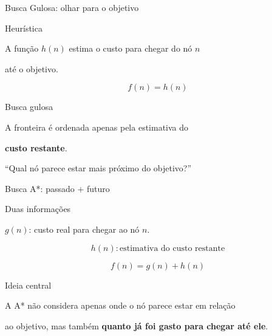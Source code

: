 \documentclass[xcolor=dvipsnames,table]{beamer}
\begin{document}
\begin{frame}{Busca Gulosa: olhar para o objetivo}

    \begin{block}{Heurística}

        A função $h(n)$ estima o custo para chegar do nó $n$

        até o objetivo.

    \end{block}

    \begin{center}

        \Large

        \[
        \boxed{f(n)=h(n)}
        \]

    \end{center}

    \begin{block}{Busca gulosa}

        A fronteira é ordenada apenas pela estimativa do

        \textbf{custo restante}.

        \medskip

        \centering

        ``Qual nó parece estar mais próximo do objetivo?''

    \end{block}

\end{frame}

\begin{frame}{Busca A*: passado + futuro}

    \begin{block}{Duas informações}

        $g(n)$: custo real para chegar ao nó $n$.

        \[
        h(n): \text{estimativa do custo restante}
        \]

    \end{block}

    \begin{center}

        \Large

        \[
        \boxed{f(n)=g(n)+h(n)}
        \]

    \end{center}

    \begin{block}{Ideia central}

        A A* não considera apenas onde o nó parece estar em relação

        ao objetivo, mas também \textbf{quanto já foi gasto para chegar até ele}.

    \end{block}

\end{frame}
\end{document}
